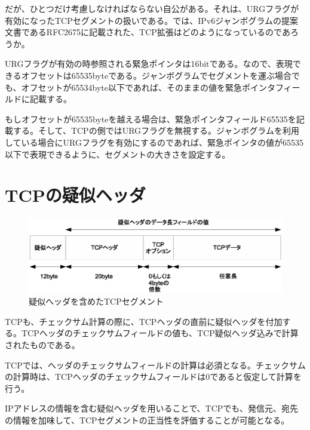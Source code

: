 だが、ひとつだけ考慮しなければならない自公がある。それは、URGフラグが有効になったTCPセグメントの扱いである。では、IPv6ジャンボグラムの提案文書であるRFC2675に記載された、TCP拡張はどのようになっているのであろうか。

URGフラグが有効の時参照される緊急ポインタは16bitである。なので、表現できるオフセットは65535byteである。ジャンボグラムでセグメントを運ぶ場合でも、オフセットが65534byte以下であれば、そのままの値を緊急ポインタフィールドに記載する。

もしオフセットが65535byteを越える場合は、緊急ポインタフィールド65535を記載する。そして、TCPの側ではURGフラグを無視する。ジャンボグラムを利用している場合にURGフラグを有効にするのであれば、緊急ポインタの値が65535以下で表現できるように、セグメントの大きさを設定する。

\section{TCPの疑似ヘッダ}

\begin{figure}[htbp]
	\includegraphics[width=12cm,clip]{draw/tcppseudo.eps}
	\caption{疑似ヘッダを含めたTCPセグメント}
	\label{fig:tcppseudo}
\end{figure}

TCPも、チェックサム計算の際に、TCPヘッダの直前に疑似ヘッダを付加する。TCPヘッダのチェックサムフィールドの値も、TCP疑似ヘッダ込みで計算されたものである。



TCPでは、ヘッダのチェックサムフィールドの計算は必須となる。チェックサムの計算時は、TCPヘッダのチェックサムフィールドは0であると仮定して計算を行う。

IPアドレスの情報を含む疑似ヘッダを用いることで、TCPでも、発信元、宛先の情報を加味して、TCPセグメントの正当性を評価することが可能となる。

